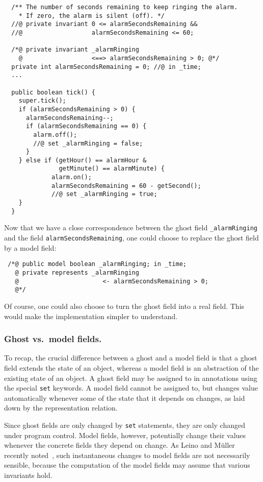 \documentclass{llncs}
\begin{document}
\begin{verbatim}
  /** The number of seconds remaining to keep ringing the alarm.
    * If zero, the alarm is silent (off). */
  //@ private invariant 0 <= alarmSecondsRemaining &&
  //@                   alarmSecondsRemaining <= 60;

  /*@ private invariant _alarmRinging
    @                   <==> alarmSecondsRemaining > 0; @*/
  private int alarmSecondsRemaining = 0; //@ in _time;
  ...

  public boolean tick() {
    super.tick();
    if (alarmSecondsRemaining > 0) {
      alarmSecondsRemaining--;
      if (alarmSecondsRemaining == 0) {
        alarm.off();
        //@ set _alarmRinging = false;
      }
    } else if (getHour() == alarmHour &
               getMinute() == alarmMinute) {
             alarm.on();
             alarmSecondsRemaining = 60 - getSecond();
             //@ set _alarmRinging = true;
    }
  }
\end{verbatim}
Now that we have a close correspondence between the
ghost field \texttt{\_alarmRinging} and the field
\texttt{alarmSecondsRemaining}, one could choose to replace
the ghost field by a model field:
\begin{verbatim}
 /*@ public model boolean _alarmRinging; in _time;
   @ private represents _alarmRinging
   @                       <- alarmSecondsRemaining > 0;
   @*/
\end{verbatim}
%
Of course, one could also choose to turn the ghost field into a real field.
This would make the implementation simpler to understand.

\subsubsection*{Ghost vs.\ model fields.}

To recap, the crucial difference between a ghost and a model field 
is that a ghost field extends the state of an object, whereas
a model field is an abstraction of the existing state of an object.
A ghost field may be assigned to in annotations using the
special \texttt{set} keywords.
A model field cannot be assigned to, but changes value automatically
whenever some of the state that it depends on changes, as laid down
by the representation relation.

Since ghost fields are only changed by \texttt{set} statements, they
are only changed under program control.  Model fields, however,
potentially change their values whenever the concrete fields they
depend on change.  As Leino and M\"{u}ller recently noted~\cite{LeinoMuller06},
such instantaneous changes to model fields are not necessarily
sensible, because the computation of the model fields may assume that
various invariants hold.
\end{document}
